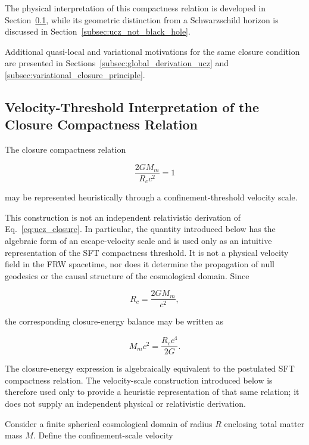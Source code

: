 \documentclass[12pt]{article}
\begin{document}
The physical interpretation of this compactness relation is developed
in Section~\ref{subsec:velocity_threshold_closure}, while its
geometric distinction from a Schwarzschild horizon is discussed in
Section~\ref{subsec:ucz_not_black_hole}.

Additional quasi-local and variational motivations for the same closure
condition are presented in
Sections~\ref{subsec:global_derivation_ucz}
and
\ref{subsec:variational_closure_principle}.


\subsection{Velocity-Threshold Interpretation of the Closure Compactness Relation}
\label{subsec:velocity_threshold_closure}

The closure compactness relation

\begin{equation}
\frac{2GM_m}{R_c c^2}=1
\label{eq:closure_compactness_velocity}
\end{equation}

may be represented heuristically through a confinement-threshold
velocity scale.

This construction is not an independent relativistic derivation of
Eq.~\eqref{eq:ucz_closure}. In particular, the quantity introduced
below has the algebraic form of an escape-velocity scale and is used
only as an intuitive representation of the SFT compactness threshold.
It is not a physical velocity field in the FRW spacetime, nor does it
determine the propagation of null geodesics or the causal structure of
the cosmological domain. Since

\begin{equation}
R_c=\frac{2GM_m}{c^2},
\end{equation}

the corresponding closure-energy balance may be written as

\begin{equation}
M_m c^2
=
\frac{R_c c^4}{2G}.
\label{eq:closure_energy_balance_velocity}
\end{equation}

The closure-energy expression is algebraically equivalent to the
postulated SFT compactness relation. The velocity-scale construction
introduced below is therefore used only to provide a heuristic
representation of that same relation; it does not supply an
independent physical or relativistic derivation.

Consider a finite spherical cosmological domain of radius \(R\)
enclosing total matter mass \(M\). Define the confinement-scale velocity
\end{document}
